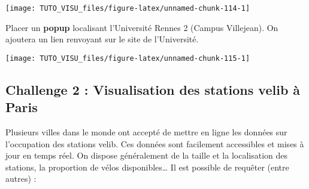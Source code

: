 \documentclass[]{book}
\newenvironment{Shaded}{\begin{snugshade}}{\end{snugshade}}
\newcommand{\DataTypeTok}[1]{\textcolor[rgb]{0.13,0.29,0.53}{#1}}
\newcommand{\DecValTok}[1]{\textcolor[rgb]{0.00,0.00,0.81}{#1}}
\newcommand{\ErrorTok}[1]{\textcolor[rgb]{0.64,0.00,0.00}{\textbf{#1}}}
\newcommand{\KeywordTok}[1]{\textcolor[rgb]{0.13,0.29,0.53}{\textbf{#1}}}
\newcommand{\NormalTok}[1]{#1}
\newcommand{\OperatorTok}[1]{\textcolor[rgb]{0.81,0.36,0.00}{\textbf{#1}}}
\newcommand{\OtherTok}[1]{\textcolor[rgb]{0.56,0.35,0.01}{#1}}
\newcommand{\StringTok}[1]{\textcolor[rgb]{0.31,0.60,0.02}{#1}}
\theoremstyle{definition}
\theoremstyle{definition}
\theoremstyle{definition}
\theoremstyle{remark}
\let\BeginKnitrBlock\begin \let\EndKnitrBlock\end
\begin{document}
\begin{center}\texttt{[image: TUTO\_VISU\_files/figure-latex/unnamed-chunk-114-1]} \end{center}

\BeginKnitrBlock{exercise}[Popup avec leaflet]
\protect\hypertarget{exr:exo-carto-popup-leaflet}{}{\label{exr:exo-carto-popup-leaflet} \iffalse (Popup avec leaflet) \fi{} }
\EndKnitrBlock{exercise}

Placer un \textbf{popup} localisant l'Université Rennes 2 (Campus Villejean). On ajoutera un lien renvoyant sur le site de l'Université.

\begin{Shaded}
\end{Shaded}

\begin{center}\texttt{[image: TUTO\_VISU\_files/figure-latex/unnamed-chunk-115-1]} \end{center}

\hypertarget{challenge-2-visualisation-des-stations-velib-uxe0-paris}{%
\subsection{Challenge 2 : Visualisation des stations velib à Paris}\label{challenge-2-visualisation-des-stations-velib-uxe0-paris}}

Plusieurs villes dans le monde ont accepté de mettre en ligne les données sur l'occupation des stations velib. Ces données sont facilement accessibles et mises à jour en temps réel. On dispose généralement de la taille et la localisation des stations, la proportion de vélos disponibles\ldots{}
Il est possible de requêter (entre autres) :
\end{document}
